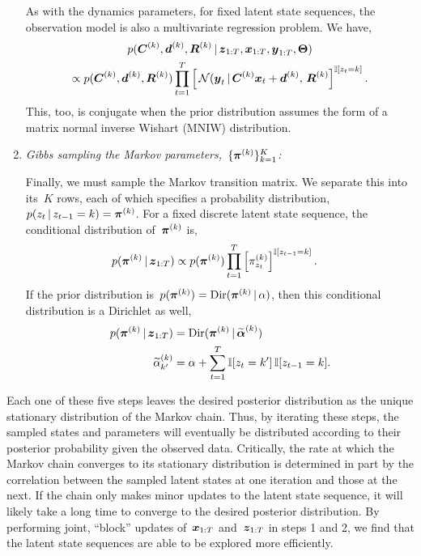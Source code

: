 \documentclass{article}
\begin{document}
\begin{enumerate}
    As with the dynamics parameters, 
    for fixed latent state sequences, the observation model is also a 
    multivariate regression problem. We have,
    \begin{multline}
      p(\boldsymbol{C}^{(k)}, \boldsymbol{d}^{(k)}, \boldsymbol{R}^{(k)}  \,|\, \boldsymbol{z}_{1:T}, \boldsymbol{x}_{1:T}, \boldsymbol{y}_{1:T}, \boldsymbol{\Theta})
      \\ 
      \propto
      p(\boldsymbol{C}^{(k)}, \boldsymbol{d}^{(k)}, \boldsymbol{R}^{(k)})
      \prod_{t=1}^T \left[ \,
        \mathcal{N}(\boldsymbol{y}_{t} \,|\, \boldsymbol{C}^{(k)} \boldsymbol{x}_{t} + \boldsymbol{d}^{(k)},\, \boldsymbol{R}^{(k)} \right]^{\mathbb{I}[z_{t}=k]}.
    \end{multline}
    This, too, is conjugate when the prior distribution assumes the
    form of a matrix normal inverse Wishart (MNIW) distribution.

  \item \textit{Gibbs sampling the Markov parameters,~$\{\boldsymbol{\pi}^{(k)}\}_{k=1}^K$:}
    
    Finally, we must sample the Markov transition matrix. We separate
    this into its~$K$ rows, each of which specifies a probability
    distribution,~$p(z_t \,|\, z_{t-1}=k) = \boldsymbol{\pi}^{(k)}$.  For a fixed
    discrete latent state sequence, the conditional distribution of~$\boldsymbol{\pi}^{(k)}$ 
    is,
    \begin{align}
      p(\boldsymbol{\pi}^{(k)} \,|\, \boldsymbol{z}_{1:T}) &\propto
      p(\boldsymbol{\pi}^{(k)}) \prod_{t=1}^T \left[ \pi_{z_t}^{(k)} \right]^{\mathbb{I}[z_{t-1}=k]}.
    \end{align}
    If the prior distribution is~$p(\boldsymbol{\pi}^{(k)}) = \mathrm{Dir}(\boldsymbol{\pi}^{(k)} \,|\, \alpha)$, then this
    conditional distribution is a Dirichlet as well,
    \begin{align}
      p(\boldsymbol{\pi}^{(k)} \,|\, \boldsymbol{z}_{1:T}) 
      &= \mathrm{Dir}(\boldsymbol{\pi}^{(k)} \,|\, \widetilde{\boldsymbol{\alpha}}^{(k)}) \\
      \widetilde{\alpha}_{k'}^{(k)} &= \alpha + \sum_{t=1}^T \mathbb{I}[z_t = k'] \, \mathbb{I}[z_{t-1}=k].
    \end{align}
\end{enumerate} 

Each one of these five steps leaves the desired posterior distribution as the 
unique stationary distribution of the Markov chain. Thus, by iterating these 
steps, the sampled states and parameters will eventually be distributed according
to their posterior probability given the observed data. Critically, the rate 
at which the Markov chain converges to its stationary distribution is determined
in part by the correlation between the sampled latent states at one iteration and
those at the next. If the chain only makes minor updates to the latent state sequence,
it will likely take a long time to converge to the desired posterior distribution.  
By performing joint, ``block'' updates of~$\boldsymbol{x}_{1:T}$ and~$\boldsymbol{z}_{1:T}$ in steps 
1 and 2, we find that the latent state sequences are able to be explored more 
efficiently.
\end{document}
